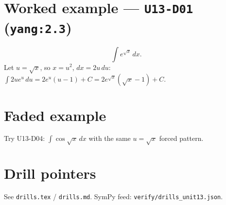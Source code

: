 \section{Worked example --- \texttt{U13-D01} (\texttt{yang:2.3})}
\[
\int e^{\sqrt{x}}\,dx.
\]
Let $u=\sqrt{x}$, so $x=u^{2}$, $dx=2u\,du$: $\int 2u e^{u}\,du=2e^{u}(u-1)+C=2e^{\sqrt{x}}(\sqrt{x}-1)+C$.

\section{Faded example}
Try U13-D04: $\int\cos\sqrt{x}\,dx$ with the same $u=\sqrt{x}$ forced pattern.

\section{Drill pointers}
See \texttt{drills.tex} / \texttt{drills.md}. SymPy feed: \texttt{verify/drills\_unit13.json}.


